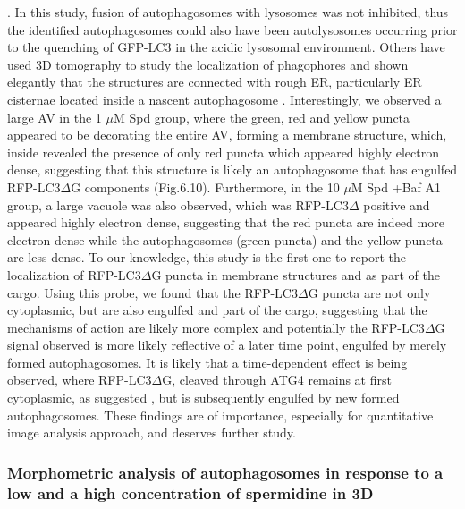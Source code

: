 \citep{Duke2014}. In this study, fusion of autophagosomes with lysosomes was not inhibited, thus the identified autophagosomes could also have been autolysosomes occurring prior to the quenching of GFP-LC3 in the acidic lysosomal environment. Others have used 3D tomography to study the localization of phagophores and shown elegantly that the structures are connected with rough ER, particularly ER cisternae located inside a nascent autophagosome \citep{Yla-Anttila2009}. Interestingly, we observed a large AV in the 1 $\mu$M Spd group, where the green, red and yellow puncta appeared to be decorating the entire AV, forming a membrane structure, which, inside revealed the presence of only red puncta which appeared highly electron dense, suggesting that this structure is likely an autophagosome that has engulfed RFP-LC3$\Delta$G components (Fig.6.10). Furthermore, in the 10 $\mu$M Spd +Baf A1 group, a large vacuole was also observed, which was RFP-LC3$\Delta$ positive and appeared highly electron dense, suggesting that the red puncta are indeed more electron dense while the autophagosomes (green puncta) and the yellow puncta are less dense. To our knowledge, this study is the first one to report the localization of RFP-LC3$\Delta$G puncta in membrane structures and as part of the cargo. Using this probe, we found that the RFP-LC3$\Delta$G puncta are not only cytoplasmic, but are also engulfed and part of the cargo, suggesting that the mechanisms of action are likely more complex and potentially the RFP-LC3$\Delta$G signal observed is more likely reflective of a later time point, engulfed by merely formed autophagosomes. It is likely that a time-dependent effect is being observed, where RFP-LC3$\Delta$G, cleaved through ATG4 remains at first cytoplasmic, as suggested \citep{Kaizuka2016}, but is subsequently engulfed by new formed autophagosomes. These findings are of importance, especially for quantitative image analysis approach, and deserves further study.

\subsubsection{Morphometric analysis of autophagosomes in response to a low and a high concentration of spermidine in 3D}

